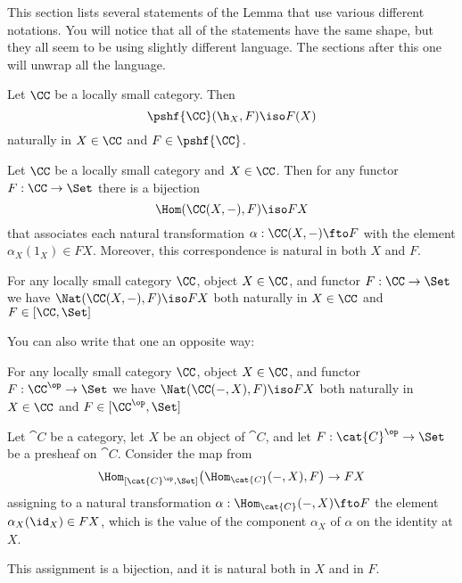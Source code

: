 This section lists several statements of the Lemma that use various different notations.
You will notice that all of the statements have the same shape, but they all seem to be
using slightly different language. The sections after this one will unwrap all the
language.

\begin{lemma}[Yoneda]   
\label{yoneda1}
Let $\CC$ be a locally small category.  Then
%
\begin{equation}        
\label{eq:yoneda}
\pshf{\CC}(\h_X, F)
\iso
F(X)
\end{equation}
%
naturally in $X \in \CC$ and $F \in \pshf{\CC}$.  
\end{lemma}

\begin{lemma}[Yoneda]\label{yoneda2} Let $\CC$ be a locally small category and $X \in
\CC$. Then for any functor $F : \CC \to \Set$ there is a bijection
$$
\Hom(\CC(X,-), F) \iso FX
$$
that associates each natural transformation $\alpha:\CC(X,-) \fto F$ with the element
$\alpha_X(1_X) \in FX$. Moreover, this correspondence is natural in both $X$ and $F$.
\end{lemma}

\begin{lemma}[Yoneda]\label{yoneda3} For any locally small category $\CC$, object $X \in
\CC$, and functor $F:\CC \to \Set$ we have  $\Nat(\CC(X,-),F) \iso FX$ both naturally in
$X \in \CC$ and $F \in [\CC, \Set]$
\end{lemma}

\noindent You can also write that one an opposite way:

\begin{lemma}[Yoneda]\label{yoneda4} For any locally small category $\CC$, object $X \in
\CC$, and functor $F:\CC^{\op} \to \Set$ we have  $\Nat(\CC(-,X),F) \iso FX$ both
naturally in $X \in \CC$ and $F \in [\CC^{\op}, \Set]$
\end{lemma}

\begin{lemma}[Yoneda]\label{yoneda5} Let $\cat{C}$ be a category, let $X$ be an object of
 $\cat{C}$, and let $F:\cat{C}^\op\to\Set$ be a presheaf on $\cat{C}$. Consider the map
 from
 $$
 \Hom_{[\cat{C}^\op,\Set]} \bigl(\Hom_\cat{C} (-,X) , F \bigr) \to FX
 $$
 assigning to a natural transformation $\alpha:\Hom_\cat{C} (-,X)\fto F$ the element
 $\alpha_X(\id_X)\in FX$, which is the value of the component $\alpha_X$ of $\alpha$ on
 the identity at $X$. 

 This assignment is a bijection, and it is natural both in $X$ and in $F$.
\end{lemma}

